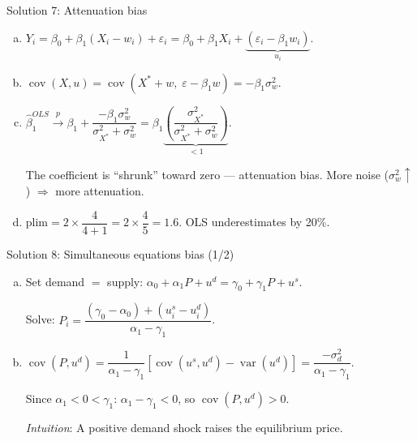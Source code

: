 \documentclass[10pt]{beamer}
\begin{document}
\begin{frame}{Solution 7: Attenuation bias}
\label{s7}
\begin{enumerate}[(a)]
  \item $Y_i = \beta_0 + \beta_1(X_i - w_i) + \varepsilon_i = \beta_0 + \beta_1 X_i + \underbrace{(\varepsilon_i - \beta_1 w_i)}_{u_i}$.

  \item $\operatorname{cov}(X, u) = \operatorname{cov}(X^* + w,\; \varepsilon - \beta_1 w) = -\beta_1\sigma_w^2$.

  \item $\widehat{\beta}_1^{OLS} \xrightarrow{p} \beta_1 + \dfrac{-\beta_1\sigma_w^2}{\sigma_{X^*}^2 + \sigma_w^2} = \beta_1\underbrace{\left(\dfrac{\sigma_{X^*}^2}{\sigma_{X^*}^2 + \sigma_w^2}\right)}_{< 1}$.

  The coefficient is ``shrunk'' toward zero --- \alert{attenuation bias}. More noise ($\sigma_w^2 \uparrow$) $\Rightarrow$ more attenuation.

  \item $\text{plim} = 2 \times \dfrac{4}{4+1} = 2 \times \dfrac{4}{5} = \boxed{1.6}$. OLS underestimates by 20\%.
\end{enumerate}

\vfill
\hfill\hyperlink{q7}{}
\end{frame}

\begin{frame}{Solution 8: Simultaneous equations bias (1/2)}
\label{s8}
\begin{enumerate}[(a)]
  \item Set demand $=$ supply: $\alpha_0 + \alpha_1 P + u^d = \gamma_0 + \gamma_1 P + u^s$.

  Solve: $P_i = \dfrac{(\gamma_0 - \alpha_0) + (u_i^s - u_i^d)}{\alpha_1 - \gamma_1}$.

  \item $\operatorname{cov}(P, u^d) = \dfrac{1}{\alpha_1 - \gamma_1}[\operatorname{cov}(u^s, u^d) - \operatorname{var}(u^d)] = \dfrac{-\sigma_d^2}{\alpha_1 - \gamma_1}$.

  Since $\alpha_1 < 0 < \gamma_1$: $\alpha_1 - \gamma_1 < 0$, so $\operatorname{cov}(P, u^d) > 0$.

  \emph{Intuition}: A positive demand shock raises the equilibrium price.
\end{enumerate}

\vfill
\hfill\hyperlink{s8b}{}
\hfill\hyperlink{q8}{}
\end{frame}
\end{document}
